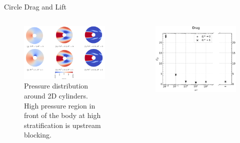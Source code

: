 \documentclass[aspectratio=169,xcolor=dvipsnames]{beamer}
\begin{document}

\begin{frame}{Circle Drag and Lift}
    \begin{columns}[c]
        \begin{figure}
            \includegraphics[width=.9\textwidth]{figures/circlepressure.png}
            \caption{Pressure distribution around 2D cylinders. High pressure region in front of the body at high stratification is upstream blocking.}
        \end{figure}
        \vspace{-5pt}
        \begin{figure}
            \includegraphics[width=\textwidth]{figures/circledrag.pdf}

\end{figure}
\end{columns}
\end{frame}
\end{document}
